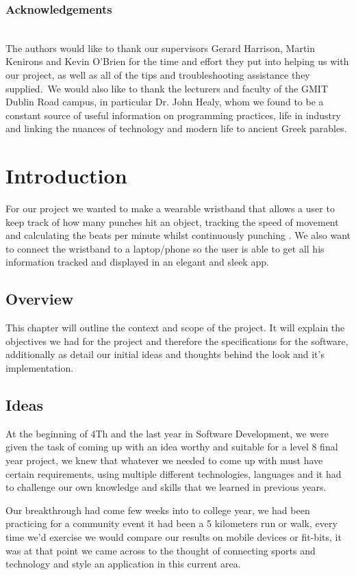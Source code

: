 \documentclass[a4paper,12pt]{report}
\begin{document}
\subsection*{Acknowledgements}
\\
The authors would like to thank our supervisors Gerard Harrison, Martin Kenirons and Kevin O’Brien for the time and effort they put into helping us with our project, as well as all of the tips and troubleshooting assistance they supplied.\ 
We would also like to thank the lecturers and faculty of the GMIT Dublin Road campus, in particular Dr. John Healy, whom we found to be a constant source of useful information on programming practices, life in industry and linking the nuances of technology and modern life to ancient Greek parables.

\body

\chapter{Introduction}
For our project we wanted to make a wearable wristband that allows a user to keep track of how many punches hit an object, tracking the speed of movement and calculating the beats per minute whilst continuously punching . We also want to connect the wristband to a laptop/phone so the user is able to get all his information tracked and displayed in an elegant and sleek app.

\section{Overview}
This chapter will outline the context and scope of the project. It
will explain the objectives we had for the project and therefore the specifications for the software, additionally as detail our initial ideas and thoughts
behind the look and it’s implementation.

\section{Ideas}
At the beginning of 4Th and the last year in Software Development, we were given the task of coming up with an idea worthy and suitable for a level 8 final year project, we knew that whatever we needed to come up with must have certain requirements, using multiple different technologies, languages and it had to challenge our own knowledge and skills that we learned in previous years.

Our breakthrough had come few weeks into to college year, we had been practicing for a community event it had been a 5 kilometers run or walk, every time we'd exercise we would compare our results on mobile devices or fit-bits, it was at that point we came across to the thought of connecting sports and technology and style an application in this current area. 
\end{document}
